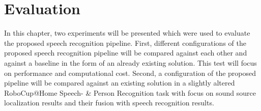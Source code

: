 

\chapter{Evaluation}
\label{eval}

In this chapter, two experiments will be presented which were used to evaluate the proposed speech recognition pipeline.
First, different configurations of the proposed speech recognition pipeline will be compared against each other and against a baseline in the form of an already existing solution.
This test will focus on performance and computational cost.
Second, a configuration of the proposed pipeline will be compared against an existing solution in a slightly altered RoboCup@Home Speech- \& Person Recognition task with focus on sound source localization results and their fusion with speech recognition results.



\newpage
